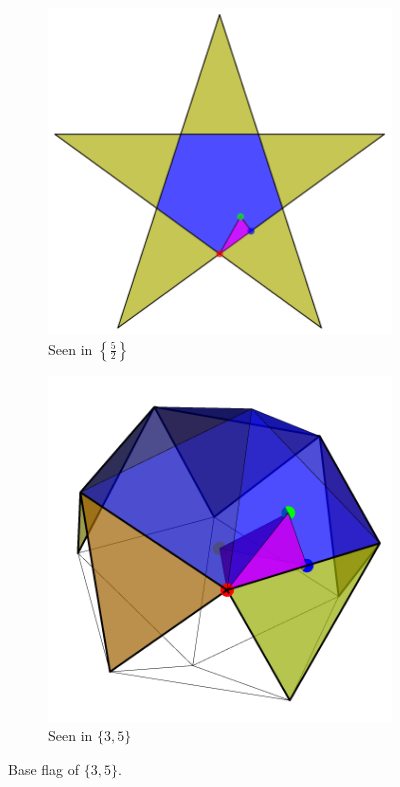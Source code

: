 \documentclass{article}
\theoremstyle{definition}
\begin{document}
	\begin{figure}[H]
		\begin{center}
			\begin{subfigure}{0.4\linewidth}
				\centering
				\includegraphics[width=\linewidth]{fig2a}
				\caption{Seen in $\left\{\frac{5}{2}\right\}$}\label{fig:2a}
			\end{subfigure}
			\begin{subfigure}{0.4\linewidth}
				\centering
				\includegraphics[width=\linewidth]{fig2b}
				\caption{Seen in $\{3,5\}$}\label{fig:2b}
			\end{subfigure}
		\end{center}
		\caption{Base flag of $\{3,5\}$.}\label{fig:2}
	\end{figure}
	
\end{document}
